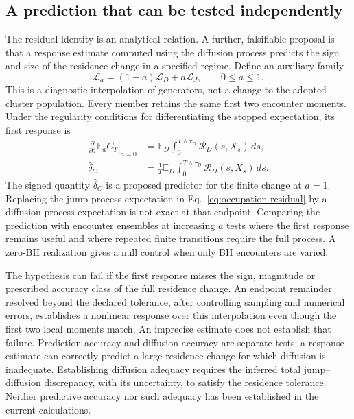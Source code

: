 \documentclass[aps,prd,reprint,amsmath,amssymb,superscriptaddress,nofootinbib,longbibliography,floatfix]{revtex4-2}
\begin{document}
\subsection{A prediction that can be tested independently}

The residual identity is an analytical relation. A further, falsifiable proposal is that a response estimate computed using the diffusion process predicts the sign and size of the residence change in a specified regime. Define an auxiliary family
\begin{equation}
\mathcal L_a=(1-a)\mathcal L_D+a\mathcal L_J,
\qquad 0\leq a\leq1.
\label{eq:generator-interpolation}
\end{equation}
This is a diagnostic interpolation of generators, not a change to the adopted cluster population. Every member retains the same first two encounter moments. Under the regularity conditions for differentiating the stopped expectation, its first response is
\begin{align}
\left.\frac{\partial}{\partial a}\mathbb E_a C_T\right|_{a=0}
&=\mathbb E_D\int_0^{T\wedge\tau_D}\mathcal R_D(s,X_s)\,ds,
\nonumber\\
\widehat\delta_C&=\frac1T\mathbb E_D
\int_0^{T\wedge\tau_D}\mathcal R_D(s,X_s)\,ds.
\label{eq:diffusion-response-predictor}
\end{align}
The signed quantity $\widehat\delta_C$ is a proposed predictor for the finite change at $a=1$. Replacing the jump-process expectation in Eq.~\eqref{eq:occupation-residual} by a diffusion-process expectation is not exact at that endpoint. Comparing the prediction with encounter ensembles at increasing $a$ tests where the first response remains useful and where repeated finite transitions require the full process. A zero-BH realization gives a null control when only BH encounters are varied.

The hypothesis can fail if the first response misses the sign, magnitude or prescribed accuracy class of the full residence change. An endpoint remainder resolved beyond the declared tolerance, after controlling sampling and numerical errors, establishes a nonlinear response over this interpolation even though the first two local moments match. An imprecise estimate does not establish that failure. Prediction accuracy and diffusion accuracy are separate tests: a response estimate can correctly predict a large residence change for which diffusion is inadequate. Establishing diffusion adequacy requires the inferred total jump--diffusion discrepancy, with its uncertainty, to satisfy the residence tolerance. Neither predictive accuracy nor such adequacy has been established in the current calculations.
\end{document}
